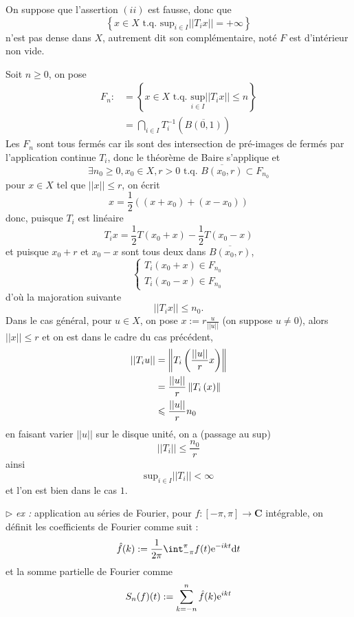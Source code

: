 \documentclass[a4paper,11pt, twoside]{article}
\begin{document}
\begin{Proof}
  On suppose que l'assertion $(ii)$ est fausse, donc que 
  $$\left\{x\in X\text{ t.q. } \mathrm{sup}_{i\in I}||T_ix||=+\infty\right\}$$ 
  n'est pas dense dans $X$, autrement dit son complémentaire, noté $F$ est d'intérieur non vide.

  Soit $n\geqslant 0$, on pose 
  \begin{align*}
    F_n:&=\left\{x\in X\text{ t.q. }\underset{i\in I}{\mathrm{sup}}||T_ix||\leqslant n\right\}\\
    &=\bigcap_{i\in I}T_i^{-1}\left(\overline{B(0,1)}\right)
  \end{align*}
  Les $F_n$ sont tous fermés car ils sont des intersection de pré-images de fermés par l'application continue $T_i$, donc le théorème de Baire s'applique et 
  $$\exists n_0\geqslant 0, x_0\in X, r>0\text{ t.q. }\overline{B(x_0,r)}\subset F_{n_0}$$
  pour $x\in X$ tel que $||x||\leqslant r$, on écrit
  $$x=\frac12\left((x+x_0)+(x-x_0)\right)$$
  donc, puisque $T_i$ est linéaire
  $$T_ix=\frac12T(x_0+x)-\frac12T(x_0-x)$$
  et puisque $x_0+r$ et $x_0-x$ sont tous deux dans $\overline{B(x_0,r)}$, 
  $$\left\{\begin{array}{l}
    T_i(x_0+x)\in F_{n_0}\\
    T_i(x_0-x)\in F_{n_0}
  \end{array}\right.$$
  d'où la majoration suivante 
  $$||T_ix||\leqslant n_0.$$
  Dans le cas général, pour $u\in X$, on pose $x:=r\frac{u}{||u||}$ (on suppose $u\neq 0$), alors $||x||\leqslant r$ et on est dans le cadre du cas précédent, 
  \begin{align*}
    ||T_iu||&=\left\lVert T_i\left(\frac{||u||}{r}x\right)\right\rVert\\
    &=\frac{||u||}{r}\left\lVert T_i\left(x\right)\right\rVert\\
    &\leqslant \frac{||u||}{r} n_0
  \end{align*}
  en faisant varier $||u||$ sur le disque unité, on a (passage au sup)
  $$||T_i||\leqslant \frac{n_0}{r}$$
  ainsi 
  $$\mathrm{sup}_{i\in I}||T_i||<\infty$$
  et l'on est bien dans le cas $\mathit 1$.
\end{Proof}

$\triangleright$\emph{ ex : }application au séries de Fourier, pour $f:[-\pi,\pi]\longrightarrow\mathbf C$ intégrable, on définit les coefficients de Fourier comme suit :
$$\hat f(k):=\frac{1}{2\pi}\int_{-\pi}^{\pi}f(t)\ex{-ikt}\mathrm dt$$
et la somme partielle de Fourier comme 
$$S_n(f)(t):=\sum_{k=-n}^n\hat f(k)\mathrm{e}^{ikt}$$
\end{document}
